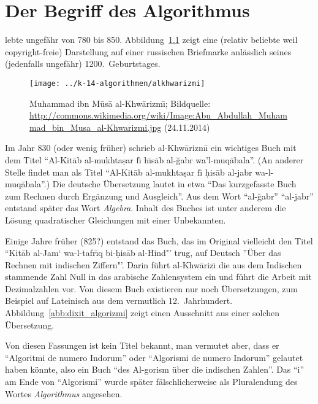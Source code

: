 \Tut\chapter{Der Begriff des Algorithmus}
\label{k:algorithmusbegriff}
\setcounter{equation}{0}

%
 lebte ungefähr von 780
bis 850. Abbildung~\ref{abb:alkhwarizmi} zeigt eine (relativ beliebte
weil copyright-freie) Darstellung auf einer russischen Briefmarke
anlässlich seines (jedenfalls ungefähr) 1200.~Geburtstages.
%
\begin{figure}[h]
  \centering
  \texttt{[image: ../k-14-algorithmen/alkhwarizmi]}
  \caption{Muhammad ibn M\=us\=a al-Khw\=arizm\=\i; Bildquelle:
    \url{http://commons.wikimedia.org/wiki/Image:Abu_Abdullah_Muhammad_bin_Musa_al-Khwarizmi.jpg}
    (24.11.2014)}
  \label{abb:alkhwarizmi}
\end{figure}
%
Im Jahr 830 (oder wenig früher) schrieb al-Khw\=arizm\={\i} ein
wichtiges Buch mit dem Titel "`Al-Kit\={a}b al-mukhta\d{s}ar f\={\i}
h\={\i}s\={a}b al-\u{g}abr wa'l-muq\={a}bala"'. (An anderer Stelle
findet man als Titel "`Al-Kit\={a}b al-mukhta\d{s}ar f\={\i}
\d{h}is\={a}b al-jabr wa-l-muq\={a}bala"'.)  Die deutsche Übersetzung
lautet in etwa "`Das kurzgefasste Buch zum Rechnen durch Ergänzung und
Ausgleich"'. Aus dem Wort "`al-\u{g}abr"' \bzw "`al-jabr"' entstand
später das Wort \emph{Algebra}.  Inhalt des Buches ist
unter anderem die Lösung quadratischer Gleichungen mit einer
Unbekannten.

Einige Jahre früher (825?) entstand das Buch, das im Original
vielleicht den Titel "`Kit\={a}b al-Jam` wa-l-tafr\={\i}q
bi-\d{h}is\={a}b al-Hind"' trug, auf Deutsch "'Über das Rechnen mit
indischen Ziffern"'. Darin führt al-Khw\=ariz\={\i} die aus dem
Indischen stammende Zahl Null in das arabische Zahlensystem ein und
führt die Arbeit mit Dezimalzahlen vor. Von diesem Buch existieren nur
noch Übersetzungen, zum Beispiel auf Lateinisch aus dem vermutlich
12.~Jahrhundert. Abbildung~\ref{abb:dixit_algorizmi} zeigt einen
Ausschnitt aus einer solchen Übersetzung.

Von diesen Fassungen ist kein Titel bekannt, man vermutet aber, dass
er "`Algoritmi de numero Indorum"' oder "`Algorismi de numero
Indorum"' gelautet haben könnte, also ein Buch "`des Al-gorism über
die indischen Zahlen"'. Das "`i"' am Ende von
"`Algorismi"' wurde später
fälschlicherweise als Pluralendung des Wortes \emph{Algorithmus}%
 angesehen.

